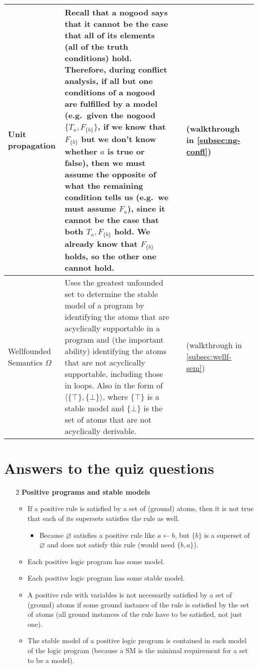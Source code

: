 \documentclass[9pt,a4paper,landscape]{article}
\newcommand{\ngfb}[1]{F_{ \{#1\} }}
\newcommand{\ngta}[1]{T_{#1}}
\newcommand{\ngfa}[1]{F_{#1}}
\begin{document}
{\begin{longtable}{Lp{14.5cm}lXX}
Unit propagation
& Recall that a nogood says that it cannot be the case that all of its elements (all of the truth conditions) hold.
Therefore, during conflict analysis, if all but one conditions of a nogood are fulfilled by a model (e.g.\ given the nogood $\{\ngta{a}, \ngfb{b}\}$, if we  know that $\ngfb{b}$ but we don't know whether $a$ is true or false), then we must assume the opposite of what the remaining condition tells us (e.g.\ we must assume $\ngfa{a}$), since it cannot be the case that both $\ngta{a}, \ngfb{b}$ hold. We already know that $\ngfb{b}$ holds, so the other one cannot hold.
&& (walkthrough in \ref{subsec:ng-confl}) &\\ \midrule

Wellfounded Semantics $\Omega$
& Uses the greatest unfounded set to determine the stable model of a program by identifying the atoms that are acyclically supportable in a program and (the important ability) identifying the atoms that are not acyclically supportable, including those in loops. 
Also in the form of $\langle \{\top\}, \{\bot\} \rangle$, where $\{\top\}$ is a stable model and $\{\bot\}$ is the set of atoms that are not acyclically derivable.
&& (walkthrough in \ref{subsec:wellf-sem}) &\\
\end{longtable}


\pagebreak



\section{Answers to the quiz questions}

\begin{itemize}
	
	\item[2] \textbf{Positive programs and stable models}
	\begin{itemize}[noitemsep]
		\item If a positive rule is satisfied by a set of (ground) atoms, then it is not true that each of its supersets satisfies the rule as well.
		\begin{itemize}[noitemsep]
			\item Because $\varnothing$ satisfies a positive rule like $a \leftarrow b$, but $\{b\}$ is a superset of $\varnothing$ and does not satisfy this rule (would need $\{b, a\}$).
		\end{itemize}
		\item Each positive logic program has some model.
		\item Each positive logic program has some stable model.
		\item A positive rule with variables is not necessarily satisfied by a set of (ground) atoms if some ground instance of the rule is satisfied by the set of atoms (all ground instances of the rule have to be satisfied, not just one).
		\item The stable model of a positive logic program is contained in each model of the logic program (because a SM is the minimal requirement for a set to be a model).
	\end{itemize}
	

\end{itemize}}
\end{document}
